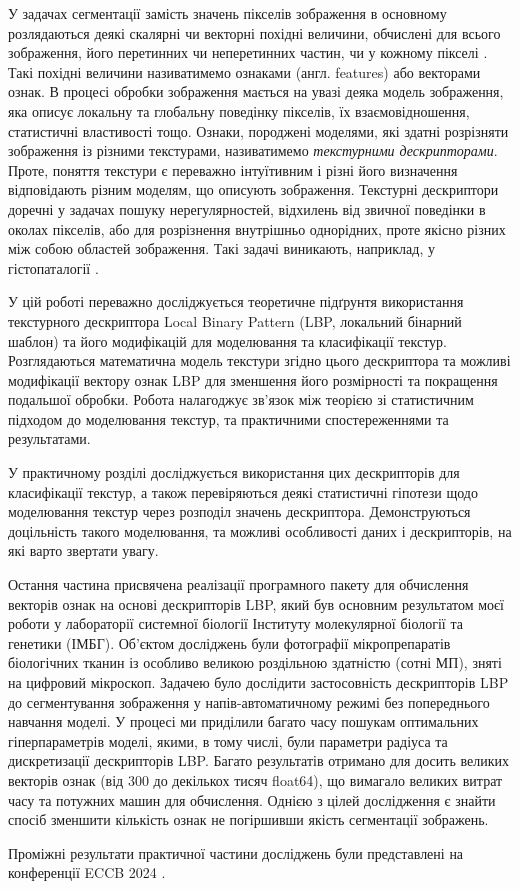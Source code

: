 У задачах сегментації замість значень пікселів зображення в основному розлядаються деякі скалярні чи векторні похідні величини,
обчислені для всього зображення, його перетинних чи неперетинних частин, чи у кожному пікселі \cite{belsare2015, simon2018, esteva2017}. 
Такі похідні величини називатимемо ознаками (англ. features) або векторами ознак.
В процесі обробки зображення мається на увазі деяка модель зображення, яка описує локальну та глобальну поведінку пікселів, їх взаємовідношення, статистичні властивості тощо.
Ознаки, породжені моделями, які здатні розрізняти зображення із різними текстурами, називатимемо \emph{текстурними дескрипторами}.
Проте, поняття текстури є переважно інтуїтивним і різні його визначення відповідають різним моделям, що описують зображення.  
Текстурні дескриптори доречні у задачах пошуку нерегулярностей, відхилень від звичної поведінки в околах пікселів, 
або для розрізнення внутрішньо однорідних, проте якісно різних між собою областей зображення. 
Такі задачі виникають, наприклад, у гістопаталогії \cite{simon2018}.

У цій роботі переважно досліджується теоретичне підґрунтя використання текстурного дескриптора Local Binary Pattern 
(LBP, локальний бінарний шаблон) \cite{ojala2002} та його модифікацій для моделювання та класифікації текстур.
Розглядаються математична модель текстури згідно цього дескриптора та можливі модифікації вектору ознак LBP для зменшення його розмірності та покращення подальшої обробки.
Робота налагоджує зв'язок між теорією зі статистичним підходом до моделювання текстур, та практичними спостереженнями та результатами.

У практичному розділі досліджується використання цих дескрипторів для класифікації текстур, 
а також перевіряються деякі статистичні гіпотези щодо моделювання текстур через розподіл значень дескриптора.
Демонструються доцільність такого моделювання, та можливі особливості даних і дескрипторів, на які варто звертати увагу.

Остання частина присвячена реалізації програмного пакету для обчислення векторів ознак на основі дескрипторів LBP, який був
основним результатом моєї роботи у лабораторії системної біології Інституту молекулярної біології та генетики (ІМБГ).
Об'єктом досліджень були фотографії мікропрепаратів біологічних тканин із особливо великою роздільною здатністю (сотні МП), зняті на цифровий мікроскоп.
Задачею було дослідити застосовність дескрипторів LBP до сегментування зображення у напів-автоматичному режимі без попереднього навчання моделі.
У процесі ми приділили багато часу пошукам оптимальних гіперпараметрів моделі, якими, в тому числі, були параметри радіуса та дискретизації дескрипторів LBP.
Багато результатів отримано для досить великих векторів ознак (від 300 до декількох тисяч float64), що вимагало великих витрат часу та потужних машин для обчислення.
Однією з цілей дослідження є знайти спосіб зменшити кількість ознак не погіршивши якість сегментації зображень.

Проміжні результати практичної частини досліджень були представлені на конференції ECCB 2024 \cite{fastlbp2024}.
